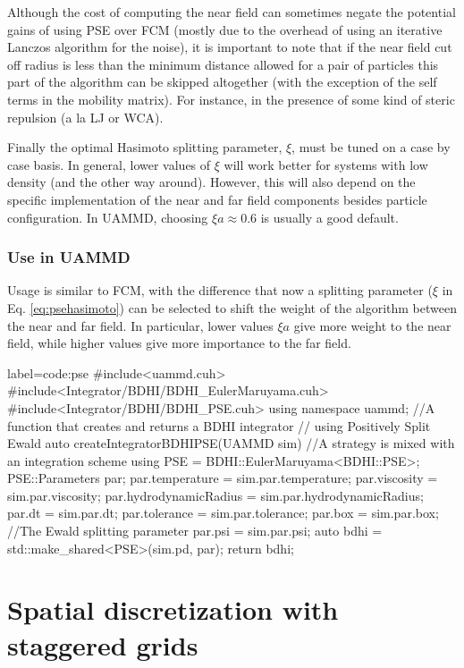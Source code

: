 \documentclass[ twoside,openright,titlepage,numbers=noenddot,%
headinclude,footinclude,cleardoublepage=empty,abstract=on,
BCOR=5mm,paper=b5,fontsize=11pt, dvipsnames
]{scrreprt}
\newcommand{\uammd}{\gls{UAMMD}\xspace}
\begin{document}
Although the cost of computing the near field can sometimes negate the potential gains of using \gls{PSE} over \gls{FCM} (mostly due to the overhead of using an iterative Lanczos algorithm for the noise), it is important to note that if the near field cut off radius is less than the minimum distance allowed for a pair of particles this part of the algorithm can be skipped altogether (with the exception of the self terms in the mobility matrix). For instance, in the presence of some kind of steric repulsion (a la \gls{LJ} or WCA).

Finally the optimal Hasimoto splitting parameter, $\xi$, must be tuned on a case by case basis. In general, lower values of $\xi$ will work better for systems with low density (and the other way around). However, this will also depend on the specific implementation of the near and far field components besides particle configuration. In \uammd, choosing $\xi a \approx 0.6$ is usually a good default.

\subsubsection*{Use in UAMMD}

Usage is similar to \gls{FCM}, with the difference that now a splitting parameter ($\xi$ in Eq. \eqref{eq:psehasimoto}) can be selected to shift the weight of the algorithm between the near and far field. In particular, lower values $\xi a$ give more weight to the near field, while higher values give more importance to the far field.

\begin{code2}  {label=code:pse}
#include<uammd.cuh>
#include<Integrator/BDHI/BDHI_EulerMaruyama.cuh>
#include<Integrator/BDHI/BDHI_PSE.cuh>
using namespace uammd;
//A function that creates and returns a BDHI integrator
// using Positively Split Ewald
auto createIntegratorBDHIPSE(UAMMD sim){   
  //A strategy is mixed with an integration scheme
  using PSE = BDHI::EulerMaruyama<BDHI::PSE>;
  PSE::Parameters par;
  par.temperature = sim.par.temperature;
  par.viscosity = sim.par.viscosity;
  par.hydrodynamicRadius = sim.par.hydrodynamicRadius;
  par.dt = sim.par.dt;
  par.tolerance = sim.par.tolerance;
  par.box = sim.par.box;
  //The Ewald splitting parameter
  par.psi = sim.par.psi;
  auto bdhi = std::make_shared<PSE>(sim.pd, par);
  return bdhi;
}
\end{code2}

\newpage
\section{Spatial discretization with staggered grids}\label{sec:staggered}
\end{document}

